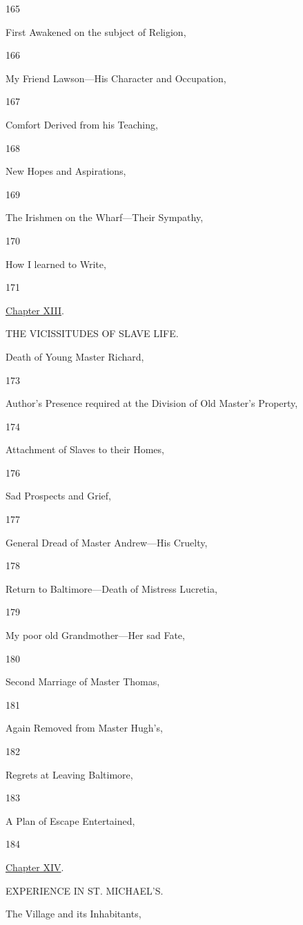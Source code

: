 165

First Awakened on the subject of Religion,

166

My Friend Lawson---His Character and Occupation,

167

Comfort Derived from his Teaching,

168

New Hopes and Aspirations,

169

The Irishmen on the Wharf---Their Sympathy,

170

How I learned to Write,

171

\href{/wiki/My_Bondage_and_My_Freedom_(1855)/Chapter_XIII}{Chapter
XIII}.

THE VICISSITUDES OF SLAVE LIFE.

Death of Young Master Richard,

173

Author's Presence required at the Division of Old Master's Property,

174

Attachment of Slaves to their Homes,

176

Sad Prospects and Grief,

177

General Dread of Master Andrew---His Cruelty,

178

Return to Baltimore---Death of Mistress Lucretia,

179

My poor old Grandmother---Her sad Fate,

180

Second Marriage of Master Thomas,

181

Again Removed from Master Hugh's,

182

Regrets at Leaving Baltimore,

183

A Plan of Escape Entertained,

184

\href{/wiki/My_Bondage_and_My_Freedom_(1855)/Chapter_XIV}{Chapter XIV}.

EXPERIENCE IN ST. MICHAEL'S.

The Village and its Inhabitants,

